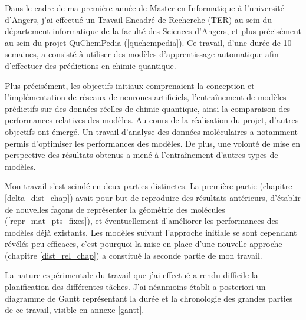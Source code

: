 
\par Dans le cadre de ma première année de Master en Informatique à l'université d'Angers, j'ai effectué un Travail Encadré de Recherche (TER) au sein du département informatique de la faculté des Sciences d'Angers, et plus précisément au sein du projet QuChemPedia (\ref{quchempedia}). Ce travail, d’une durée de 10 semaines, a consisté à utiliser des modèles d'apprentissage automatique afin d'effectuer des prédictions en chimie quantique.\\

\par Plus précisément, les objectifs initiaux comprenaient la conception et l'implémentation de réseaux de neurones artificiels, l'entraînement de modèles prédictifs sur des données réelles de chimie quantique, ainsi la comparaison des performances relatives des modèles. Au cours de la réalisation du projet, d'autres objectifs ont émergé. Un travail d'analyse des données moléculaires a notamment permis d'optimiser les performances des modèles. De plus, une volonté de mise en perspective des résultats obtenus a mené à l'entraînement d'autres types de modèles.\\

\par Mon travail s'est scindé en deux parties distinctes. La première partie (chapitre \ref{delta_dist_chap}) avait pour but de reproduire des résultats antérieurs, d'établir de nouvelles façons de représenter la géométrie des molécules (\ref{repr_mat_pts_fixes}), et éventuellement d'améliorer les performances des modèles déjà existants. Les modèles suivant l'approche initiale se sont cependant révélés peu efficaces, c'est pourquoi la mise en place d'une nouvelle approche (chapitre \ref{dist_rel_chap}) a constitué la seconde partie de mon travail.\\

\par La nature expérimentale du travail que j'ai effectué a rendu difficile la planification des différentes tâches. J'ai néanmoins établi a posteriori un diagramme de Gantt représentant la durée et la chronologie des grandes parties de ce travail, visible en annexe \ref{gantt}.
